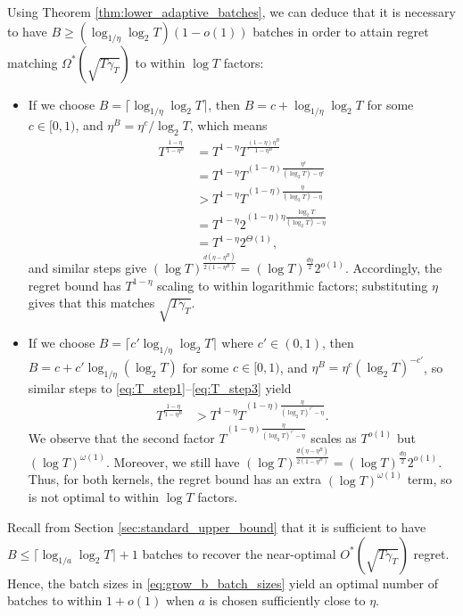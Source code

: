 \documentclass[10pt]{article}
\begin{document}
\begin{remark}
    \label{rmk:necessary_B}
    Using Theorem \ref{thm:lower_adaptive_batches}, we can deduce that it is necessary to have $B \geq (\log_{1/\eta}\log_2T )(1-o(1))$ batches in order to attain regret matching $\Omega^*(\sqrt{T\gamma_T})$ to within $\log T$ factors:
    
    \begin{itemize}
        \item If we choose $B=\lceil\log_{1/\eta}\log_2T \rceil $, 
        then $B = c+\log_{1/\eta}\log_2 T $ for some $c\in[0,1)$,
        and  $\eta^B = \eta^c/ \log_2 T $, which means
        \begin{align}
            T^{\frac{1-\eta}{1-\eta^B}}
            & = T^{1-\eta}T^{\frac{(1-\eta)\eta^B}{1-\eta^B}} \label{eq:T_step1} \\
            & = T^{1-\eta}T^{(1-\eta)\frac{\eta^c}{(\log_2 T)-\eta^c}} \\
            & > T^{1-\eta}T^{(1-\eta)\frac{\eta}{(\log_2 T)-\eta}} \label{eq:T_step3} \\
            & = T^{1-\eta}2^{(1-\eta)\eta\frac{\log_2 T}{(\log_2 T)-\eta}} \\
            & = T^{1-\eta}2^{\Theta(1)},
        \end{align}
        and similar steps give $(\log T)^{\frac{d(\eta-\eta^B)}{2(1-\eta^B)}} = (\log T)^{\frac{d\eta}{2}}2^{o(1)} $.  Accordingly, the regret bound has $T^{1-\eta}$ scaling to within logarithmic factors; substituting $\eta$ gives that this matches $\sqrt{T\gamma_T}$. 
        \item If we choose $B=\lceil c'\log_{1/\eta} \log_2T \rceil$ where $c'\in(0,1)$, 
        then $B= c+c'\log_{1/\eta}(\log_2T) $ for some $c\in[0,1)$,
        and $\eta^B= \eta^{c} (\log_2 T)^{-c'}$, so similar steps to \eqref{eq:T_step1}--\eqref{eq:T_step3} yield
        \begin{align}
            T^{\frac{1-\eta}{1-\eta^B}}
            & > T^{1-\eta}T^{(1-\eta)\frac{\eta}{(\log_2 T)^{c'}-\eta }}.
        \end{align}
        We observe that the second factor $T^{(1-\eta)\frac{\eta}{(\log_2 T)^{c'}-\eta }}$ 
        scales as $T^{o(1)}$ but $(\log T)^{\omega(1)}$.
        Moreover, we still have $(\log T)^{\frac{d(\eta-\eta^B)}{2(1-\eta^B)}} = (\log T)^{\frac{d\eta}{2}}2^{o(1)} $.
        Thus, for both kernels, the regret bound has an extra $(\log T)^{\omega(1)}$ term, so is not optimal to within $\log T$ factors.
    \end{itemize}
    Recall from Section \ref{sec:standard_upper_bound} that it is sufficient to have $B \leq \lceil \log_{1/a}\log_2 T \rceil + 1$ batches to recover the near-optimal $O^*(\sqrt{T\gamma_T})$ regret. Hence, the batch sizes in \eqref{eq:grow_b_batch_sizes} yield an optimal number of batches to within $1+o(1)$
    when $a$ is chosen sufficiently close to $\eta$.
\end{remark}
\end{document}
